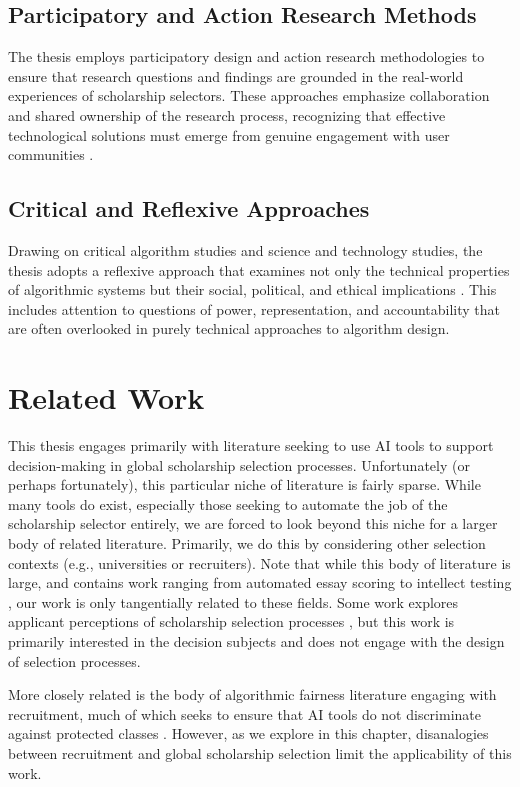 \subsection{Participatory and Action Research Methods}
The thesis employs participatory design and action research methodologies to ensure that research questions and findings are grounded in the real-world experiences of scholarship selectors. These approaches emphasize collaboration and shared ownership of the research process, recognizing that effective technological solutions must emerge from genuine engagement with user communities \cite{hayes2011knowing}.

\subsection{Critical and Reflexive Approaches}
Drawing on critical algorithm studies and science and technology studies, the thesis adopts a reflexive approach that examines not only the technical properties of algorithmic systems but their social, political, and ethical implications \cite{seaver2017algorithms}. This includes attention to questions of power, representation, and accountability that are often overlooked in purely technical approaches to algorithm design.

\section{Related Work}
This thesis engages primarily with literature seeking to use AI tools to support decision-making in global scholarship selection processes. Unfortunately (or perhaps fortunately), this particular niche of literature is fairly sparse. While many tools do exist, especially those seeking to automate the job of the scholarship selector entirely, we are forced to look beyond this niche for a larger body of related literature. Primarily, we do this by considering other selection contexts (e.g., universities or recruiters). Note that while this body of literature is large, and contains work ranging from automated essay scoring to intellect testing \cite{cozma_automated_2018,condon2014international}, our work is only tangentially related to these fields. Some work explores applicant perceptions of scholarship selection processes \cite{10.1145/3351095.3372867}, but this work is primarily interested in the decision subjects and does not engage with the design of selection processes.

More closely related is the body of algorithmic fairness literature engaging with recruitment, much of which seeks to ensure that AI tools do not discriminate against protected classes \cite{dwork_fairness_2012}. However, as we explore in this chapter, disanalogies between recruitment and global scholarship selection limit the applicability of this work.

